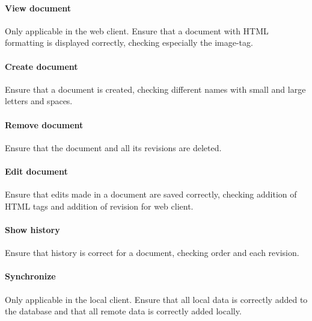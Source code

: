 	\paragraph{View document}
	Only applicable in the web client. Ensure that a document with HTML formatting is displayed correctly, checking especially the image-tag.

	\paragraph{Create document}
	Ensure that a document is created, checking different names with small and large letters and spaces.

	\paragraph{Remove document}
	Ensure that the document and all its revisions are deleted.

	\paragraph{Edit document}
	Ensure that edits made in a document are saved correctly, checking addition of HTML tags and addition of revision for web client.

	\paragraph{Show history}
	Ensure that history is correct for a document, checking order and each revision.

	\paragraph{Synchronize}
	Only applicable in the local client. Ensure that all local data is correctly added to the database and that all remote data is correctly added locally.
